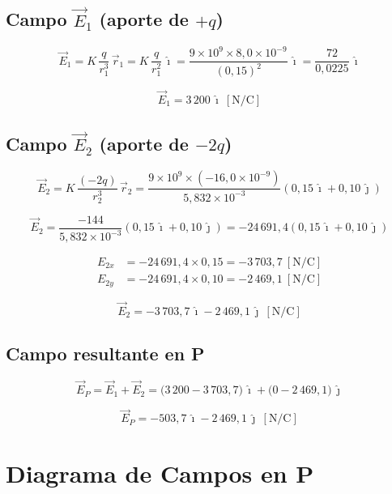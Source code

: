 \documentclass[12pt,letterpaper]{article}
\begin{document}
\subsection*{Campo $\vec{E}_1$ (aporte de $+q$)}

\[
    \vec{E}_1 = K\,\frac{q}{r_1^3}\,\vec{r}_1
    = K\,\frac{q}{r_1^2}\,\hat{\imath}
    = \frac{9\times10^9 \times 8{,}0\times10^{-9}}{(0{,}15)^2}\,\hat{\imath}
    = \frac{72}{0{,}0225}\,\hat{\imath}
\]

\[
    \boxed{\vec{E}_1 = 3\,200\,\hat{\imath}\ [\text{N/C}]}
\]

\subsection*{Campo $\vec{E}_2$ (aporte de $-2q$)}

\[
    \vec{E}_2 = K\,\frac{(-2q)}{r_2^3}\,\vec{r}_2
    = \frac{9\times10^9 \times (-16{,}0\times10^{-9})}{5{,}832\times10^{-3}}
      \left(0{,}15\,\hat{\imath} + 0{,}10\,\hat{\jmath}\right)
\]

\[
    \vec{E}_2 = \frac{-144}{5{,}832\times10^{-3}}
      \left(0{,}15\,\hat{\imath} + 0{,}10\,\hat{\jmath}\right)
    = -24\,691{,}4\left(0{,}15\,\hat{\imath} + 0{,}10\,\hat{\jmath}\right)
\]

\begin{align*}
    E_{2x} &= -24\,691{,}4 \times 0{,}15 = -3\,703{,}7\ [\text{N/C}]\\[4pt]
    E_{2y} &= -24\,691{,}4 \times 0{,}10 = -2\,469{,}1\ [\text{N/C}]
\end{align*}

\[
    \boxed{\vec{E}_2 = -3\,703{,}7\,\hat{\imath} - 2\,469{,}1\,\hat{\jmath}\ [\text{N/C}]}
\]

\subsection*{Campo resultante en P}

\[
    \vec{E}_P = \vec{E}_1 + \vec{E}_2
    = \bigl(3\,200 - 3\,703{,}7\bigr)\,\hat{\imath}
    + \bigl(0 - 2\,469{,}1\bigr)\,\hat{\jmath}
\]

\[
    \boxed{\vec{E}_P = -503{,}7\,\hat{\imath} - 2\,469{,}1\,\hat{\jmath}\ [\text{N/C}]}
\]

\section*{Diagrama de Campos en P}
\end{document}
